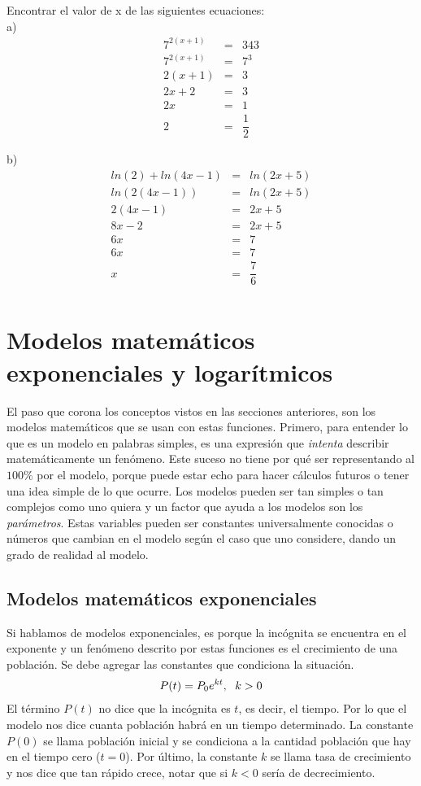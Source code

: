 \begin{myexample}
Encontrar el valor de x de las siguientes ecuaciones:\\

\noindent a)
\begin{eqnarray*}
7^{2(x+1)}&=&343\\
7^{2(x+1)}&=&7^{3}\\
2(x+1)&=&3\\
2x+2&=&3\\
2x&=&1\\
2&=&\dfrac{1}{2}
\end{eqnarray*}
\end{myexample}
\noindent b)
\begin{eqnarray*}
ln(2)+ln(4x-1)&=&ln(2x+5)\\
ln(2(4x-1))&=&ln(2x+5)\\
2(4x-1)&=&2x+5\\
8x-2&=&2x+5\\
6x&=&7\\
6x&=&7\\
x&=&\dfrac{7}{6}\\
\end{eqnarray*}

\section{Modelos matemáticos exponenciales y logarítmicos}

El paso que corona los conceptos vistos en las secciones anteriores, son los modelos matemáticos que se usan con estas funciones. Primero, para entender lo que es un modelo en palabras simples, es una expresión que \textit{intenta} describir matemáticamente un fenómeno. Este suceso no tiene por qué ser representando al $100\%$ por el modelo, porque puede estar echo para hacer cálculos futuros o tener una idea simple de lo que ocurre. Los modelos pueden ser tan simples o tan complejos como uno quiera y un factor que ayuda a los modelos son los \textit{parámetros}. Estas variables pueden ser constantes universalmente conocidas o números que cambian en el modelo según el caso que uno considere, dando un grado de realidad al modelo.

\subsection{Modelos matemáticos exponenciales}
Si hablamos de modelos exponenciales, es porque  la incógnita se encuentra en el exponente y un fenómeno descrito por estas funciones es el crecimiento de una población. Se debe agregar las constantes que condiciona la situación.
\begin{eqnarray}
P(t)=P_{0}e^{kt}, \hspace{6px} k>0 
\end{eqnarray} 
El término $P(t)$ no dice que la incógnita es $t$, es decir, el tiempo. Por lo que el modelo nos dice cuanta población habrá en un tiempo determinado. La constante $P(0)$ se llama población inicial y se condiciona a la cantidad población que hay en el tiempo cero ($t=0$). Por último, la constante $k$ se llama tasa de crecimiento y nos dice que tan rápido crece, notar que si $k<0$ sería de decrecimiento. 

